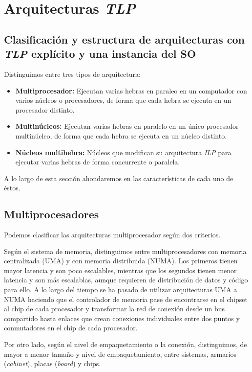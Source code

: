 \section{Arquitecturas \textit{TLP}}

\subsection{Clasificación y estructura de arquitecturas con \textit{TLP} explícito y una instancia del SO}

Distinguimos entre tres tipos de arquitectura:

\begin{itemize}
	\item\textbf{Multiprocesador:} Ejecutan varias hebras en paraleo en un computador con varios núcleos o procesadores, de forma que cada hebra se ejecuta en un procesador distinto.
	\item\textbf{Multinúcleos:} Ejecutan varias hebras en paralelo en un único procesador multinúcleo, de forma que cada hebra se ejecuta en un núcleo distinto.
	\item\textbf{Núcleos multihebra:} Núcleos que modifican su arquitectura \textit{ILP} para ejecutar varias hebras de forma concurrente o paralela.
\end{itemize}

A lo largo de esta sección ahondaremos en las características de cada uno de éstos.

\subsection{Multiprocesadores}

Podemos clasificar las arquitecturas multiprocesador según dos criterios.

Según el sistema de memoria, distinguimos entre multiprocesadores con memoria centralizada (UMA) y con memoria distribuida (NUMA).
Los primeros tienen mayor latencia y son poco escalables, mientras que los segundos tienen menor latencia y son más escalablas, aunque requieren de distribución de datos y código para ello.
A lo largo del tiempo se ha pasado de utilizar arquitecturas UMA a NUMA haciendo que el controlador de memoria pase de encontrarse en el chipset al chip de cada procesador y transformar la red de conexión desde un bus compartido hasta enlaces que crean conexiones individuales entre dos puntos y conmutadores en el chip de cada procesador.

Por otro lado, según el nivel de empaquetamiento o la conexión, distinguimos, de mayor a menor tamaño y nivel de empaquetamiento, entre sistemas, armarios (\textit{cabinet}), placas (\textit{board}) y chips.

